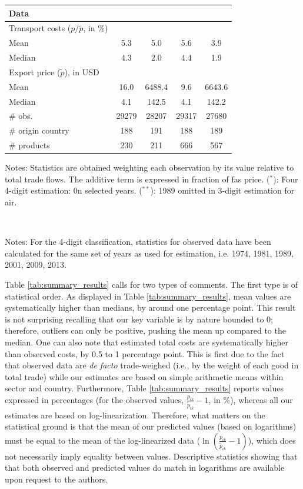 \documentclass[a4paper,11pt]{article}
\begin{document}
\begin{table}[htbp]
{\begin{center}
\begin{tabular}{l|cc|cc}
    \multicolumn{5}{l}{\textbf{Data}  } \\ \hline
    Transport costs ($p/\widetilde{p}$, in \%) & & & & \\ \hline
    Mean & 5.3 & 5.0& 5.6&3.9 \\
    Median & 4.3 & 2.0 & 4.4& 1.9 \\ \hline
    Export price ($\widetilde{p}$), in USD & & & & \\
    Mean & 16.0 &	6488.4	&9.6	&6643.6 \\
    Median & 4.1	& 142.5	& 4.1	& 142.2 \\ \hline
    \# obs. & 29279 & 28207 & 29317 & 27680 \\
    \# origin country & 188 & 191 & 188 & 189 \\
    \# products & 230 & 211 & 666 & 567 \\  \hline \hline
  \end{tabular}
    \end{center}}
\parbox[l]{10cm}{\tiny{Notes: Statistics are obtained weighting each observation by its value relative to total trade flows. The additive term is expressed in fraction of fas price. ($^\ast$): Four 4-digit estimation: 0n selected years. ($^{\ast \ast}$): 1989 omitted in 3-digit estimation for air.}}\\
\parbox[l]{10cm}{\tiny{Notes: For the  4-digit classification, statistics for observed data have been calculated for the same set of years as used for estimation, i.e. 1974, 1981, 1989, 2001, 2009, 2013.}}
\end{table}%

Table \ref{tab:summary_results} calls for two types of comments. The first type is of statistical order. As displayed in Table \ref{tab:summary_results}, mean values are systematically higher than medians, by around one percentage point. This result is not surprising recalling that our key variable is by nature bounded to 0; therefore, outliers can only be positive, pushing the mean up compared to the median. One can also note that estimated total costs are systematically higher than observed costs, by 0.5 to 1 percentage point. This is first due to the fact that observed data are \textit{de facto} trade-weighed (i.e., by the weight of each good in total trade) while our estimates are based on simple arithmetic means within sector and country. Furthermore, Table \ref{tab:summary_results} reports values expressed in percentages (for the observed values, $\frac{p_{ik}}{\widetilde{p}_{ik}} -1$, in \%), whereas all our estimates are based on log-linearization. Therefore, what matters on the statistical ground is that the mean of our predicted values (based on logarithms) must be equal to the mean of the log-linearized data ($\ln\left(\frac{p_{ik}}{\widetilde{p}_{ik}}-1 \right)$), which does not necessarily imply equality between values. Descriptive statistics showing that that both observed and predicted values do match in logarithms are available upon request to the authors.\medskip
\end{document}
